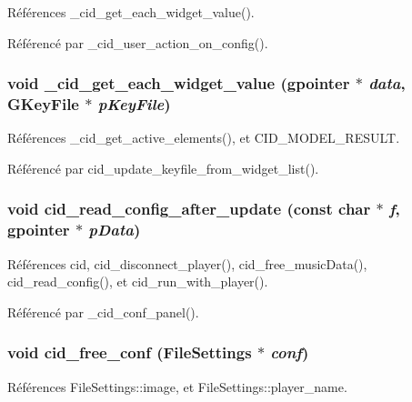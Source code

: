 Références \_\-cid\_\-get\_\-each\_\-widget\_\-value().

Référencé par \_\-cid\_\-user\_\-action\_\-on\_\-config().
\subsubsection{\setlength{\rightskip}{0pt plus 5cm}void \_\-cid\_\-get\_\-each\_\-widget\_\-value (gpointer $\ast$ {\em data}, \/  GKeyFile $\ast$ {\em pKeyFile})}\label{cid-config_8h_ab4246cffd42c2d1e7548e1f52d69082}




Références \_\-cid\_\-get\_\-active\_\-elements(), et CID\_\-MODEL\_\-RESULT.

Référencé par cid\_\-update\_\-keyfile\_\-from\_\-widget\_\-list().
\subsubsection{\setlength{\rightskip}{0pt plus 5cm}void cid\_\-read\_\-config\_\-after\_\-update (const char $\ast$ {\em f}, \/  gpointer $\ast$ {\em pData})}\label{cid-config_8h_f1fe3c86fa896a97e605559ae2b88b41}




Références cid, cid\_\-disconnect\_\-player(), cid\_\-free\_\-musicData(), cid\_\-read\_\-config(), et cid\_\-run\_\-with\_\-player().

Référencé par \_\-cid\_\-conf\_\-panel().
\subsubsection{\setlength{\rightskip}{0pt plus 5cm}void cid\_\-free\_\-conf ({\bf FileSettings} $\ast$ {\em conf})}\label{cid-config_8h_2b89918241ccf974ebbc275fcbf938af}




Références FileSettings::image, et FileSettings::player\_\-name.

